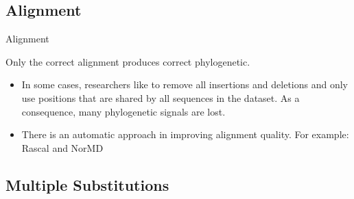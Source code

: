 \documentclass[10pt]{beamer}
\newcommand{\1}{
	\setbeamertemplate{background}{
		\texttt{[image: img/1]}
		\tikz[overlay] \fill[fill opacity=0.75,fill=white] (0,0) rectangle (-\paperwidth,\paperheight);
	}
}
\begin{document}
\subsection{Alignment}

\begin{frame}{Alignment}{}
	\begin{block}{}
		Only the correct alignment produces correct phylogenetic.
	\end{block}

	\begin{block}{}
		\begin{itemize}
			\item  In some cases, researchers like to remove all insertions and deletions and only use positions that are shared by all sequences in the dataset. As a consequence, many phylogenetic signals are lost.
			
			\item There is an automatic approach in improving alignment quality. For example: Rascal 	and NorMD
		\end{itemize}
	\end{block}
\end{frame}

\subsection{Multiple Substitutions}
\end{document}
